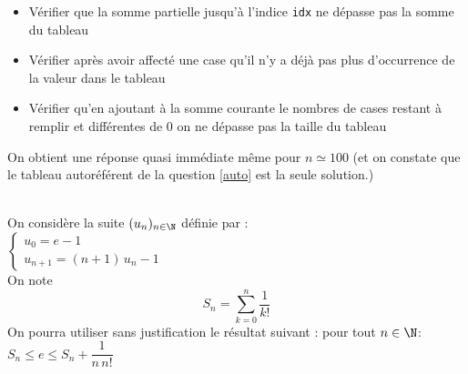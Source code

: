 \documentclass[11pt,a4paper]{article}
\begin{document}
\begin{Exercise}[title = {Tableaux autoréférents}, origin = {\bac \; Oraux {\sc ccinp}}]
{\begin{itemize}
        \item Vérifier que la somme partielle jusqu'à l'indice {\tt idx} ne dépasse pas la somme du tableau
        \item Vérifier après avoir affecté une case qu'il n'y a déjà pas plus d'occurrence de la valeur dans le tableau
        \item Vérifier qu'en ajoutant à la somme courante le nombres de cases restant à remplir et différentes de 0 on ne dépasse pas la taille du tableau
    \end{itemize}
    On obtient une réponse quasi immédiate même pour $n \simeq 100$ (et on constate que le tableau autoréférent de la question \ref{auto} est la seule solution.)
    }
\end{Exercise}

\begin{Exercise}[title = {Convergence d'une suite}]\\
On considère la suite $(u_n)_{n \in \N}$ définie par : \\
$\left\{ \begin{array}{ll} u_0=e-1 \\ u_{n+1} = (n+1)\,u_n - 1 \end{array}\right.$ \\
On note $$S_n = \displaystyle{\sum_{k=0}^n \frac{1}{k!}}$$ 
On pourra utiliser sans justification le résultat suivant : pour tout $n \in \N$: \mbox{$S_n \leq e \leq S_n + \dfrac{1}{n\,n!}$}
\end{Exercise}
\end{document}

